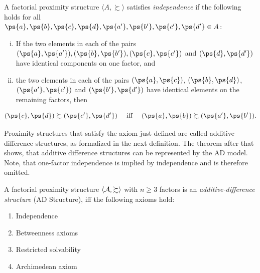 \begin{ax}[Independence] \label{def-independ}
A factorial proximity structure $\langle A, \succsim \rangle$ satisfies \emph{independence} if the following holds for all $\ps{a}, \ps{b}, \ps{c}, \ps{d}, \ps{a'}, \ps{b'}, \ps{c'}, \ps{d'} \in A$:
\begin{enumerate}[(i)]
  \item If the two elements in each of the pairs $(\ps{a}, \ps{a'}), (\ps{b}, \ps{b'}), (\ps{c}, \ps{c'})$ and $(\ps{d}, \ps{d'})$ have identical components on one factor, and
  \item the two elements in each of the pairs $(\ps{a}, \ps{c})$, $(\ps{b}, \ps{d})$, $(\ps{a'}, \ps{c'})$ and $(\ps{b'}, \ps{d'})$ have identical elements on the remaining factors, then
\end{enumerate}
$$
(\ps{c}, \ps{d}) \succsim (\ps{c'}, \ps{d'}) \quad \text{ iff } \quad  (\ps{a}, \ps{b}) \succsim (\ps{a'}, \ps{b'}).
$$
\end{ax}

Proximity structures that satisfy the axiom just defined are called additive difference structures, as formalized in the next definition.
The theorem after that shows, that additive difference structures can be represented by the AD model.
Note, that one-factor independence is implied by independence and is therefore omitted.

\begin{defi}\label{def-add-diff-ps} 
  A factorial proximity structure $\langle \mathcal{A}, \succsim \rangle$ with $n \geq 3$ factors is an \emph{additive-difference structure} (AD Structure), iff the following axioms hold:
\begin{enumerate}
  \item Independence
  \item Betweenness axioms
  \item Restricted solvability
  \item Archimedean axiom
\end{enumerate}
\end{defi}



